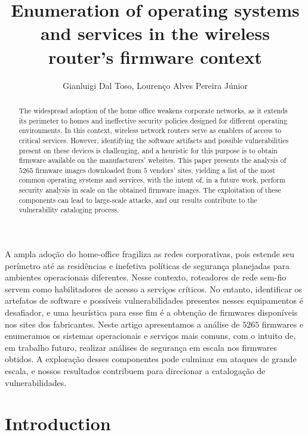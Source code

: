 \documentclass[12pt]{article}
\title{Enumeration of operating systems and services in the wireless router's firmware context}
\author{Gianluigi Dal Toso\inst{1}, Lourenço Alves Pereira Júnior\inst{1}}
\begin{document}
 

\maketitle


\begin{abstract}
The widespread adoption of the home office weakens corporate networks, as it extends its perimeter to homes and ineffective security policies designed for different operating environments. In this context, wireless network routers serve as enablers of access to critical services. However, identifying the software artifacts and possible vulnerabilities present on these devices is challenging, and a heuristic for this purpose is to obtain firmware available on the manufacturers' websites. This paper presents the analysis of $5265$ firmware images downloaded from $5$ vendors' sites, yielding a list of the most common operating systems and services, with the intent of, in a future work, perform security analysis in scale on the obtained firmware images. The exploitation of these components can lead to large-scale attacks, and our results contribute to the vulnerability cataloging process.
\end{abstract}
     
\begin{resumo} 
A ampla adoção do home-office fragiliza as redes corporativas, pois estende seu perímetro até as residências e inefetiva políticas de segurança planejadas para ambientes operacionais diferentes.  Nesse contexto, roteadores de rede sem-fio servem como habilitadores de acesso a serviços críticos.  No entanto, identificar os artefatos de software e possíveis vulnerabilidades presentes nesses equipamentos é desafiador, e uma heurística para esse fim é a obtenção de firmwares disponíveis nos sites dos fabricantes.  Neste artigo apresentamos a análise de $5265$ firmwares e enumeramos os sistemas operacionais e serviços mais comuns, com o intuito de, em trabalho futuro, realizar análises de segurança em escala nos firmwares obtidos. A exploração desses componentes pode culminar em ataques de grande escala, e nossos resultados contribuem para direcionar a catalogação de vulnerabilidades.
\end{resumo}


\section{Introduction}
\end{document}
